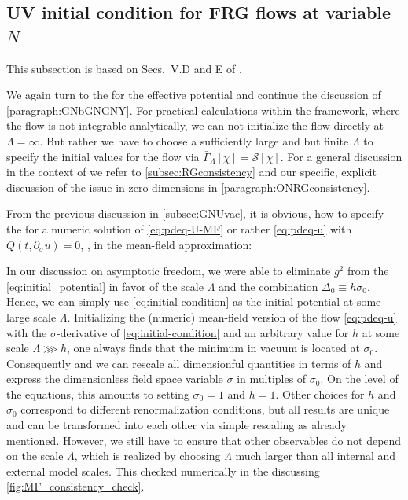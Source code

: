\subsection{UV initial condition for FRG flows at variable \texorpdfstring{$N$}{N}}\label{subsec:UUV}
\begin{disclaimer}
	This subsection is based on Secs.~V.D and E of .
\end{disclaimer}
We again turn to the \uv{} \ic{} for the effective potential and continue the discussion of \cref{paragraph:GNbGNGNY}.
For practical calculations within the \frg{} framework, where the flow is not integrable analytically, we can not initialize the \frg{} flow directly at $\Lambda = \infty$.
But rather we have to choose a sufficiently large and but finite $\Lambda$ to specify the initial values for the flow via $\bar{\Gamma}_\Lambda [ \chi ] = \mathcal{S} [ \chi ]$.
For a general discussion in the context of \rgcy{} we refer to \cref{subsec:RGconsistency} and our specific, explicit discussion of the issue in zero dimensions in \cref{paragraph:ONRGconsistency}.\bigskip

From the previous discussion in \cref{subsec:GNUvac}, it is obvious, how to specify the \ic{} for a numeric solution of \cref{eq:pdeq-U-MF} or rather \cref{eq:pdeq-u} with $Q ( t, \partial_\sigma u) = 0$, \ie{}, in the mean-field approximation:

In our discussion on asymptotic freedom, we were able to eliminate $g^2$ from the \ic{} \eqref{eq:initial_potential} in favor of the \uv{} scale $\Lambda$ and the combination $\Delta_0\equiv h \sigma_0$.
Hence, we can simply use \cref{eq:initial-condition} as the initial potential at some large scale $\Lambda$.
Initializing the (numeric) mean-field version of the \frg{} flow \eqref{eq:pdeq-u} with the $\sigma$-derivative of \eqref{eq:initial-condition} and an arbitrary value for $h$ at some scale $\Lambda \ggg h$, one always finds that the \ir{} minimum in vacuum is located at $\sigma_0$. 
Consequently and \wlogA{} we can rescale all dimensionful quantities in terms of $h$ and express the dimensionless field space variable $\sigma$ in multiples of $\sigma_0$.
On the level of the equations, this amounts to setting $\sigma_0 = 1$ and $h = 1$.
Other choices for $h$ and $\sigma_0$ correspond to different renormalization conditions, but all results are unique and can be transformed into each other via simple rescaling \dash{} as already mentioned.
However, we still have to ensure that other \ir{} observables do not depend on the \uv{} scale $\Lambda$, which is realized by choosing $\Lambda$ much larger than all internal and external model scales. 
This checked numerically in the  discussing \cref{fig:MF_consistency_check}.\bigskip

